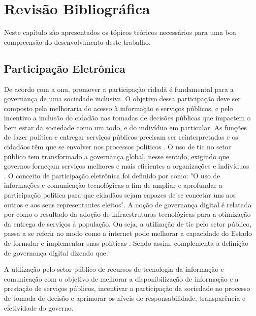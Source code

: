\chapter[Revisão Bibliográfica]{Revisão Bibliográfica} 
\label{cap:cap2}
Neste capítulo são apresentados os tópicos teóricos necessários para uma boa compreensão do desenvolvimento deste trabalho.

\section{Participação Eletrônica}
\label{sec:e-part}
De acordo com a \acrshort{onu}, promover a participação cidadã é fundamental para a governança de uma sociedade inclusiva.
O objetivo dessa participação deve ser composto pela melhoraria do acesso à informação e serviços públicos,
e pelo incentivo a inclusão do cidadão nas tomadas de decisões públicas que impactem o bem estar da sociedade como um todo, e do indivíduo em particular. 
As funções de fazer política e entregar serviços públicos precisam ser reinterpretadas e os cidadãos têm que se envolver nos processos políticos \cite{bovaird2007beyond}. 
O uso de \acrfull{tic} no setor público tem transformado a governança global, nesse sentido, exigindo que governos forneçam
serviços melhores e mais eficientes a organizações e indivíduos \cite{afdb2014uneca}. O conceito de participação eletrônica foi definido por  como:
"O uso de informações e comunicação tecnológicas a fim de ampliar e aprofundar a participação política para que cidadãos sejam capazes de se conectar 
uns aos outros e aos seus representantes eleitos".
A noção de governança digital é relatada por  como o resultado da adoção de infraestruturas tecnológicas para a otimização da entrega de serviços à população.
Ou seja, a utilização de \acrshort{tic} pelo setor público, passa a se referir ao modo como a internet pode melhorar a capacidade do Estado de formular
e implementar suas políticas \cite{parra2017governancca}. Sendo assim,  complementa a definição de governança digital dizendo que:

\hspace{4cm}
\begin{minipage}{.66\textwidth}		
    \begin{singlespace}
        \fontsize{10}{12}\selectfont A utilização pelo setor público de recursos de tecnologia da informação e comunicação com o objetivo de melhorar a disponibilização
        de informação e a prestação de serviços públicos,
        incentivar a participação da sociedade no processo de tomada de decisão e aprimorar os níveis de responsabilidade, transparência e efetividade do governo.    
        \end{singlespace}
\end{minipage}

